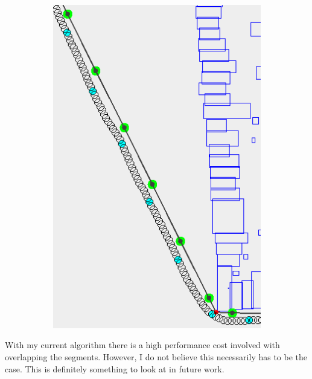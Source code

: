 \begin{figure}[h]
\begin{subfigure}[t]{.45\textwidth}
        		\includegraphics[width=\textwidth]{img/sf-wavy2b}
        		\caption{}
        		\label{fig:sf-wavy2b}
	\end{subfigure}	
	
        
    \caption{}\label{fig:sf-wavy}
\end{figure}
With my current algorithm there is a high performance cost involved with overlapping the segments. However, I do not believe this necessarily has to be the case. This is definitely something to look at in future work.


